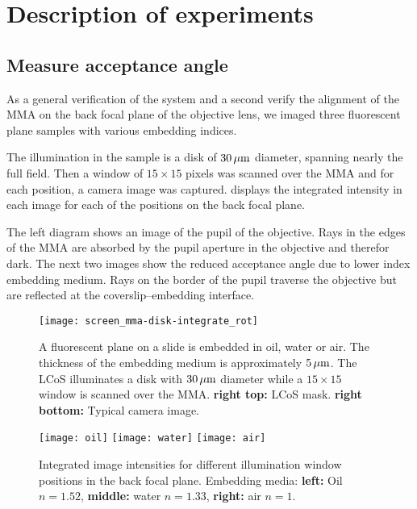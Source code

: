 \chapter{Description of experiments}

\section{Measure acceptance angle}
As a general verification of the system and a second verify the
alignment of the MMA on the back focal plane of the objective lens, we
imaged three fluorescent plane samples with various embedding indices.

The illumination in the sample is a disk of $\unit[30]{\mu m}$
diameter, spanning nearly the full field. Then a window of
$15\times15$ pixels was scanned over the MMA and for each position, a
camera image was captured.  displays
the integrated intensity in each image for each of the positions on
the back focal plane.

The left diagram shows an image of the pupil of the objective. Rays in
the edges of the MMA are absorbed by the pupil aperture in the
objective and therefor dark. The next two images show the reduced
acceptance angle due to lower index embedding medium. Rays on the
border of the pupil traverse the objective but are reflected at the
coverslip--embedding interface.

\begin{figure}[!hbt]
  \centering
   
  \texttt{[image: screen\_mma-disk-integrate\_rot]}
  \caption{A fluorescent plane on a slide is embedded in oil, water or
    air. The thickness of the embedding medium is approximately
    $\unit[5]{\mu m}$. The LCoS illuminates a disk with $\unit[30]{\mu
      m}$ diameter while a $15\times 15$ window is scanned over the
    MMA. {\bf right top:} LCoS mask. {\bf right bottom:} Typical
    camera image.}
  \label{fig:tirf-exp}
\end{figure}


\begin{figure}[!hbt]
  \centering
  \texttt{[image: oil]}
  \texttt{[image: water]}
  \texttt{[image: air]}
  \caption{Integrated image intensities for different illumination
    window positions in the back focal plane. Embedding media: {\bf
      left:} Oil $n=1.52$, {\bf middle:} water $n=1.33$, {\bf right:}
    air $n=1$.  }
  \label{fig:immersion-bfp-scan}
\end{figure}

